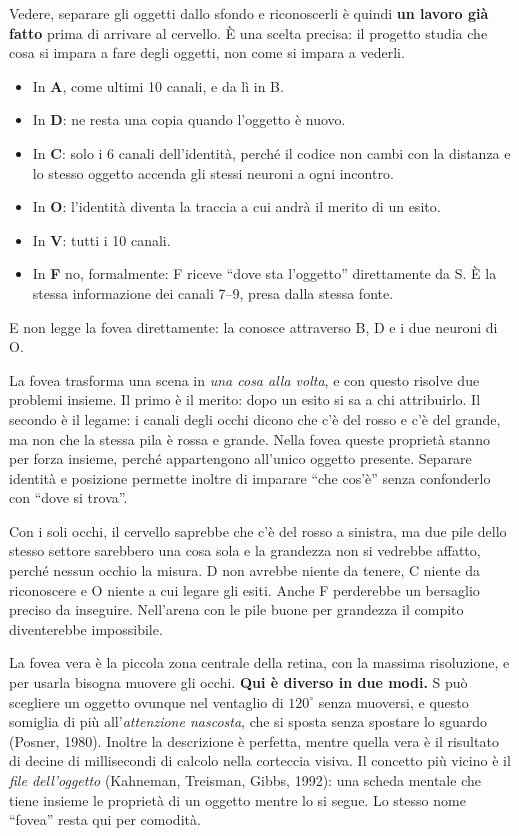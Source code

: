 \documentclass[11pt,a4paper]{article}
\newcommand{\voce}[1]{\par\smallskip\noindent{\bfseries\color{acc}#1}\par\nopagebreak}
\begin{document}
Vedere, separare gli oggetti dallo sfondo e riconoscerli è quindi \textbf{un lavoro già
fatto} prima di arrivare al cervello. È una scelta precisa: il progetto studia che cosa
si impara a fare degli oggetti, non come si impara a vederli.

\voce{Dove va}
\begin{itemize}
\item In \textbf{A}, come ultimi 10 canali, e da lì in B.
\item In \textbf{D}: ne resta una copia quando l'oggetto è nuovo.
\item In \textbf{C}: solo i 6 canali dell'identità, perché il codice non cambi con la
  distanza e lo stesso oggetto accenda gli stessi neuroni a ogni incontro.
\item In \textbf{O}: l'identità diventa la traccia a cui andrà il merito di un esito.
\item In \textbf{V}: tutti i 10 canali.
\item In \textbf{F} no, formalmente: F riceve ``dove sta l'oggetto'' direttamente da S.
  È la stessa informazione dei canali 7--9, presa dalla stessa fonte.
\end{itemize}
E non legge la fovea direttamente: la conosce attraverso B, D e i due neuroni di O.

\voce{Perché serve}
La fovea trasforma una scena in \emph{una cosa alla volta}, e con questo risolve due
problemi insieme. Il primo è il merito: dopo un esito si sa a chi attribuirlo. Il secondo
è il legame: i canali degli occhi dicono che c'è del rosso e c'è del grande, ma non che
la stessa pila è rossa e grande. Nella fovea queste proprietà stanno per forza insieme,
perché appartengono all'unico oggetto presente. Separare identità e posizione permette
inoltre di imparare ``che cos'è'' senza confonderlo con ``dove si trova''.

\voce{Se mancasse}
Con i soli occhi, il cervello saprebbe che c'è del rosso a sinistra, ma due pile dello
stesso settore sarebbero una cosa sola e la grandezza non si vedrebbe affatto, perché
nessun occhio la misura. D non avrebbe niente da tenere, C niente da riconoscere e O
niente a cui legare gli esiti. Anche F perderebbe un bersaglio preciso da inseguire.
Nell'arena con le pile buone per grandezza il compito diventerebbe impossibile.

\voce{Nel cervello}
La fovea vera è la piccola zona centrale della retina, con la massima risoluzione, e per
usarla bisogna muovere gli occhi. \textbf{Qui è diverso in due modi.} S può scegliere un
oggetto ovunque nel ventaglio di $120^\circ$ senza muoversi, e questo somiglia di più
all'\emph{attenzione nascosta}, che si sposta senza spostare lo sguardo (Posner, 1980).
Inoltre la descrizione è perfetta, mentre quella vera è il risultato di decine di
millisecondi di calcolo nella corteccia visiva. Il concetto più vicino è il \emph{file
dell'oggetto} (Kahneman, Treisman, Gibbs, 1992): una scheda mentale che tiene insieme le
proprietà di un oggetto mentre lo si segue. Lo stesso nome ``fovea'' resta qui per
comodità.
\end{document}
